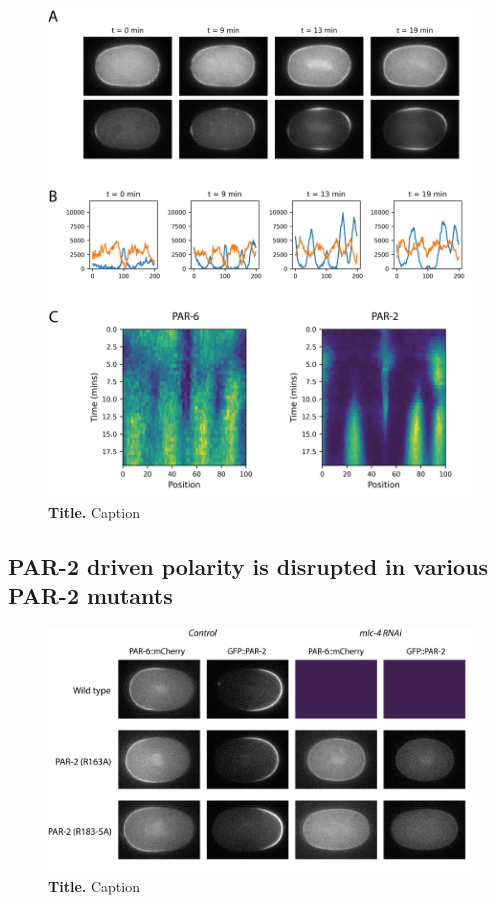 \documentclass[12pt]{"article"}
\newcommand{\mycaption}[2]{\caption[#1]{\textbf{#1.} #2}}
\begin{document}
\begin{figure}[!h]
\includegraphics[scale=0.9]{uniform_polarity_sb}
\setlength{\abovecaptionskip}{20pt}
\centering
\mycaption{Title}{Caption}
\label{fig:uniform_polarity_sb}
\end{figure}

\clearpage
\subsection{PAR-2 driven polarity is disrupted in various PAR-2 mutants}

\begin{figure}[!h]
\includegraphics[scale=0.9]{uniform_polarity_mutants}
\setlength{\abovecaptionskip}{20pt}
\centering
\mycaption{Title}{Caption}
\label{fig:uniform_polarity_mutants}
\end{figure}
\end{document}
